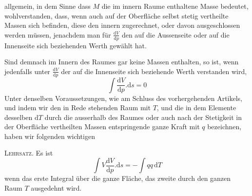 allgemein, in dem Sinne dass $M$ die im innern Raume enthaltene Masse bedeutet, wohlverstanden, dass, wenn auch auf der Oberfläche selbst stetig vertheilte Massen sich befinden, diese den innern zugerechnet, oder davon ausgeschlossen werden müssen, jenachdem man für $\frac{\mathrm dV}{\mathrm dp}$ den auf die Aussenseite oder auf die Innenseite sich beziehenden Werth gewählt hat.

Sind demnach im Innern des Raumes gar keine Massen enthalten, so ist, wenn jedenfalls unter $\frac{\mathrm dV}{\mathrm dp}$ der auf die Innenseite sich beziehende Werth verstanden wird,
\[
\int\frac{\mathrm dV}{\mathrm dp}.\mathrm ds=0
\]
Unter denselben Voraussetzungen, wie am Schluss des vorhergehenden Artikels, und indem wir den in Rede stehenden Raum mit $T$, und die in dem Elemente desselben $\mathrm dT$ durch die ausserhalb des Raumes oder auch nach der Stetigkeit in der Oberfläche vertheilten Massen entspringende ganze Kraft mit $q$ bezeichnen, haben wir folgenden wichtigen

\textsc{Lehrsatz.} Es ist
\[
\int V\frac{\mathrm dV}{\mathrm dp}.\mathrm ds=-\int qq\,\mathrm dT
\]
wenn das erste Integral über die ganze Fläche, das zweite durch den ganzen Raum $T$ ausgedehnt wird.

